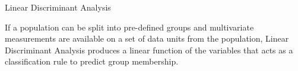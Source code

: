 Linear Discriminant Analysis	


If a population can be split into pre-defined groups and multivariate measurements are
available on a set of data units from the population, Linear Discriminant Analysis produces a linear function of the 
variables that acts as a classification rule to predict group membership.
